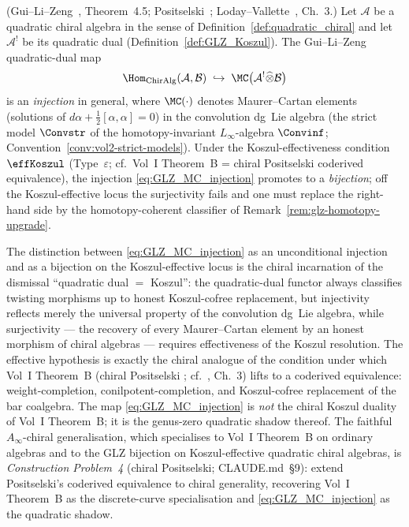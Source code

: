 \begin{theorem}
\label{thm:GLZ_MC}
(Gui--Li--Zeng~\cite{GLZ22}, Theorem~4.5; Positselski~\cite{Positselski11}; Loday--Vallette~\cite{LV12}, Ch.~3.)
Let $\mathcal{A}$ be a quadratic chiral algebra in the sense of
Definition~\ref{def:quadratic_chiral} and let $\mathcal{A}^!$ be its
quadratic dual (Definition~\ref{def:GLZ_Koszul}). The
Gui--Li--Zeng quadratic-dual map
\begin{equation}
\label{eq:GLZ_MC_injection}
\Hom_{\mathrm{ChirAlg}}(\mathcal{A}, \mathcal{B})
 \;\hookrightarrow\;
 \MC\bigl(\mathcal{A}^! \widehat{\otimes} \mathcal{B}\bigr)
\end{equation}
is an \emph{injection} in general, where $\MC(\cdot)$ denotes
Maurer--Cartan elements (solutions of
$d\alpha + \tfrac{1}{2}[\alpha,\alpha] = 0$) in the convolution
dg~Lie algebra (the strict model $\Convstr$ of the
homotopy-invariant $L_\infty$-algebra $\Convinf$; Convention~\ref{conv:vol2-strict-models}). Under the Koszul-effectiveness condition $\effKoszul$ (Type~$\varepsilon$; cf.\ Vol~I Theorem~B = chiral Positselski coderived
equivalence), the injection \eqref{eq:GLZ_MC_injection} promotes to
a \emph{bijection}; off the Koszul-effective locus the surjectivity
fails and one must replace the right-hand side by the homotopy-coherent
classifier of Remark~\ref{rem:glz-homotopy-upgrade}.
\end{theorem}

\begin{remark}
\label{rem:GLZ_MC_eff_caveat}
The distinction between \eqref{eq:GLZ_MC_injection} as an
unconditional injection and as a bijection on the Koszul-effective
locus is the chiral incarnation of the dismissal
``quadratic dual $=$ Koszul'': the quadratic-dual functor always
classifies twisting morphisms up to honest Koszul-cofree
replacement, but injectivity reflects merely the universal property
of the convolution dg~Lie algebra, while surjectivity --- the
recovery of every Maurer--Cartan element by an honest morphism of
chiral algebras --- requires effectiveness of the Koszul resolution.
The effective hypothesis is exactly the chiral analogue of the
condition under which Vol~I Theorem~B (chiral Positselski
\cite{Positselski11}; cf.\ \cite{LV12}, Ch.~3) lifts to a coderived
equivalence: weight-completion, conilpotent-completion, and
Koszul-cofree replacement of the bar coalgebra. The map
\eqref{eq:GLZ_MC_injection} is \emph{not} the chiral Koszul duality
of Vol~I Theorem~B; it is the genus-zero quadratic shadow thereof.
The faithful $A_\infty$-chiral generalisation, which
specialises to Vol~I Theorem~B on ordinary algebras and to the
GLZ bijection on Koszul-effective quadratic chiral algebras, is
\emph{Construction Problem~4} (chiral Positselski; CLAUDE.md~\S9):
extend Positselski's coderived equivalence to chiral generality,
recovering Vol~I Theorem~B as the discrete-curve specialisation
and \eqref{eq:GLZ_MC_injection} as the quadratic shadow.
\end{remark}

